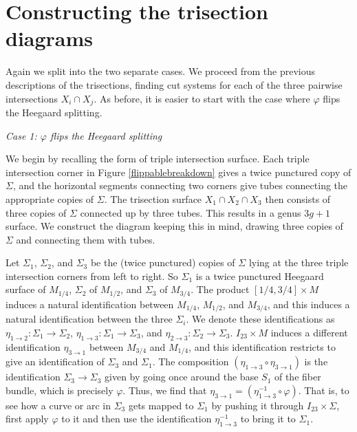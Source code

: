 \documentclass[12pt]{amsart}
\theoremstyle{definition}
\theoremstyle{remark}
\begin{document}
\section{Constructing the trisection diagrams}
\label{sec_diagrams}

Again we split into the two separate cases.
We proceed from the previous descriptions of the trisections, finding cut systems for each of the three pairwise intersections $X_i \cap X_j$.
As before, it is easier to start with the case where $\varphi$ flips the Heegaard splitting.

\smallskip
\noindent\textit{Case 1: $\varphi$ flips the Heegaard splitting}\ \

We begin by recalling the form of triple intersection surface.
Each triple intersection corner in Figure \ref{flippablebreakdown} gives a twice punctured copy of $\Sigma$, and the horizontal segments connecting two corners give tubes connecting the appropriate copies of $\Sigma$.
The trisection surface $X_1 \cap X_2 \cap X_3$ then consists of three copies of $\Sigma$ connected up by three tubes.
This results in a genus $3g+1$ surface.
We construct the diagram keeping this in mind, drawing three copies of $\Sigma$ and connecting them with tubes.


Let $\Sigma_1$, $\Sigma_2$, and $\Sigma_3$ be the (twice punctured) copies of $\Sigma$ lying at the three triple intersection corners from left to right.
So $\Sigma_1$ is a twice punctured Heegaard surface of $M_{1/4}$, $\Sigma_2$ of $M_{1/2}$, and $\Sigma_3$ of $M_{3/4}$.
The product $[1/4, 3/4] \times M$ induces a natural identification between $M_{1/4}$, $M_{1/2}$, and $M_{3/4}$, and this induces a natural identification between the three $\Sigma_i$.
We denote these identifications as $\eta_{1 \to 2}\colon \Sigma_1 \to \Sigma_2$, $\eta_{1 \to 3}\colon \Sigma_1 \to \Sigma_3$, and $\eta_{2 \to 3}\colon \Sigma_2 \to \Sigma_3$.
$I_{23} \times M$ induces a different identification $\eta_{3 \to 1}$ between $M_{3/4}$ and $M_{1/4}$, and this identification restricts to give an identification of $\Sigma_3$ and $\Sigma_1$.
The composition $(\eta_{1 \to 3} \circ \eta_{3 \to 1})$ is the identification $\Sigma_3 \to \Sigma_3$ given by going once around the base $S_1$ of the fiber bundle, which is precisely $\varphi$.
Thus, we find that $\eta_{3 \to 1} = (\eta_{1 \to 3}^{-1} \circ \varphi)$.
That is, to see how a curve or arc in $\Sigma_3$ gets mapped to $\Sigma_1$ by pushing it through $I_{23} \times \Sigma$, first apply $\varphi$ to it and then use the identification $\eta_{1 \to 3}^{-1}$ to bring it to $\Sigma_1$.
\end{document}
